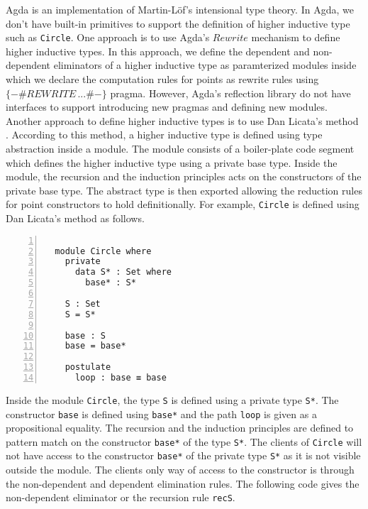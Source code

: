 \documentclass[sigplan,10pt]{acmart}
\begin{document}
\normalsize

Agda is an implementation of Martin-Löf’s intensional type theory. In Agda, we don't have built-in primitives to support the definition of higher inductive type such as {\tt Circle}. One approach is to use Agda's $Rewrite$ \cite{Agda-doc-2017} mechanism to define higher inductive types. In this approach, we define the dependent and non-dependent eliminators of a higher inductive type as paramterized modules inside which we declare the computation rules for points as rewrite rules using $\{-\# REWRITE \, ...\#-\}$ pragma. However, Agda's reflection library do not have interfaces to support introducing new pragmas and defining new modules. Another approach to define higher inductive types is to use Dan Licata's method \cite{Licata-2011}. According to this method, a higher inductive type is defined using type abstraction inside a module. The module consists of a boiler-plate code segment which defines the higher inductive type using a private base type. Inside the module, the recursion and the induction principles acts on the constructors of the private base type. The abstract type is then exported allowing the reduction rules for point constructors to hold definitionally. For example, {\tt Circle} is defined using Dan Licata's method as follows.

\begin{center}
\begingroup
\fontsize{7pt}{9pt}\selectfont
\begin{Verbatim}[frame = lines, rulecolor=\color{blue}, numbers = left, numbersep = 0pt]

  module Circle where
    private
      data S* : Set where
        base* : S*

    S : Set
    S = S*

    base : S
    base = base*
	   
    postulate
      loop : base ≡ base

\end{Verbatim}
\endgroup
\end{center}

\normalsize

Inside the module {\tt Circle}, the type {\tt S} is defined using a private type {\tt S*}. The constructor {\tt base} is defined using {\tt base*} and the path {\tt loop} is given as a propositional equality. The recursion and the induction principles are defined to pattern match on the constructor {\tt base*} of the type {\tt S*}. The clients of {\tt Circle} will not have access to the constructor {\tt base*} of the private type {\tt S*} as it is not visible outside the module. The clients only way of access to the constructor is through the non-dependent and dependent elimination rules. The following code gives the non-dependent eliminator or the recursion rule {\tt recS}. 
\end{document}

